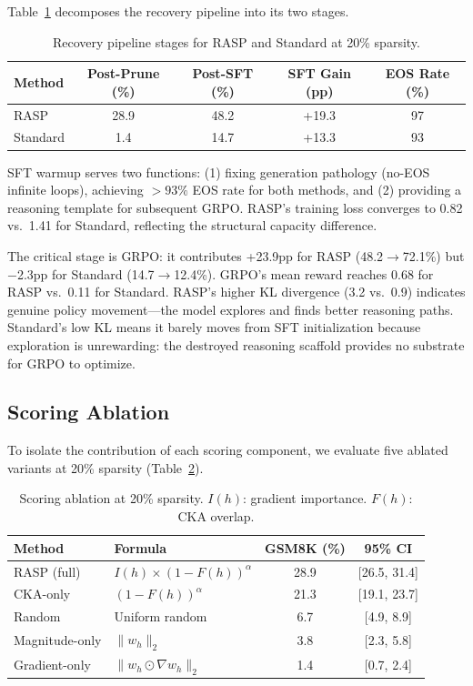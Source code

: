\documentclass[11pt]{article}
\begin{document}
Table~\ref{tab:pipeline} decomposes the recovery pipeline into its two stages.

\begin{table}[t]
\centering
\caption{Recovery pipeline stages for RASP and Standard at 20\% sparsity.}
\label{tab:pipeline}
\begin{tabular}{lcccc}
\toprule
\textbf{Method} & \textbf{Post-Prune (\%)} & \textbf{Post-SFT (\%)} & \textbf{SFT Gain (pp)} & \textbf{EOS Rate (\%)} \\
\midrule
RASP     & 28.9 & 48.2 & +19.3 & 97 \\
Standard & 1.4  & 14.7 & +13.3 & 93 \\
\bottomrule
\end{tabular}
\end{table}

SFT warmup serves two functions: (1) fixing generation pathology (no-EOS infinite loops), achieving $>93\%$ EOS rate for both methods, and (2) providing a reasoning template for subsequent GRPO.
RASP's training loss converges to 0.82 vs.\ 1.41 for Standard, reflecting the structural capacity difference.

The critical stage is GRPO: it contributes +23.9pp for RASP (48.2$\to$72.1\%) but $-$2.3pp for Standard (14.7$\to$12.4\%).
GRPO's mean reward reaches 0.68 for RASP vs.\ 0.11 for Standard.
RASP's higher KL divergence (3.2 vs.\ 0.9) indicates genuine policy movement---the model explores and finds better reasoning paths.
Standard's low KL means it barely moves from SFT initialization because exploration is unrewarding: the destroyed reasoning scaffold provides no substrate for GRPO to optimize.


\subsection{Scoring Ablation}
\label{sec:ablation}

To isolate the contribution of each scoring component, we evaluate five ablated variants at 20\% sparsity (Table~\ref{tab:ablation}).

\begin{table}[t]
\centering
\caption{Scoring ablation at 20\% sparsity. $I(h)$: gradient importance. $F(h)$: CKA overlap.}
\label{tab:ablation}
\begin{tabular}{llcc}
\toprule
\textbf{Method} & \textbf{Formula} & \textbf{GSM8K (\%)} & \textbf{95\% CI} \\
\midrule
RASP (full)      & $I(h) \times (1-F(h))^\alpha$ & 28.9 & {[26.5, 31.4]} \\
CKA-only         & $(1-F(h))^\alpha$             & 21.3 & {[19.1, 23.7]} \\
Random           & Uniform random                & 6.7  & {[4.9, 8.9]} \\
Magnitude-only   & $\|w_h\|_2$                   & 3.8  & {[2.3, 5.8]} \\
Gradient-only    & $\|w_h \odot \nabla w_h\|_2$  & 1.4  & {[0.7, 2.4]} \\
\bottomrule
\end{tabular}
\end{table}
\end{document}
